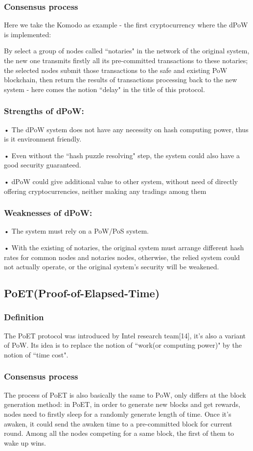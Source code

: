 \documentclass[]{article}
\begin{document}
\begin{CJK*}{UTF8}{gbsn}
    \subsubsection*{Consensus process}
    Here we take the Komodo as example - the first cryptocurrency where the dPoW is implemented:
	\par By select a group of nodes called ``notaries" in the network of the original system, the new one transmits firstly all its pre-committed transactions to these notaries;	the selected nodes submit those transactions to the safe and existing PoW blockchain, then return the results of transactions processing back to the new system - here comes the notion ``delay" in the title of this protocol.
	\subsubsection*{Strengths of dPoW:}		
    • The dPoW system does not have any necessity on hash computing power, thus is it environment friendly.
    \par • Even without the ``hash puzzle resolving" step, the system could also have a good security guaranteed.
    \par • dPoW could give additional value to other system, without need of directly offering cryptocurrencies, neither making any tradings among them
	\subsubsection*{Weaknesses of dPoW:}	
    • The system must rely on a PoW/PoS system.
    \par • With the existing of notaries, the original system must arrange different hash rates for common nodes and notaries nodes, otherwise, the relied system could not actually operate, or the original system’s security will be weakened.
    
    \subsection{ PoET(Proof-of-Elapsed-Time)} 
\subsubsection*{Definition} 
The PoET protocol was introduced by Intel research team[14], it’s also a variant of PoW. Its idea is to replace the notion of ``work(or computing power)" by the notion of ``time cost".
	\subsubsection*{Consensus process}
	The process of PoET is also basically the same to PoW, only differs at the block generation method: in PoET, in order to generate new blocks and get rewards, nodes need to firstly sleep for a randomly generate length of time. Once it’s awaken, it could send the awaken time to a pre-committed block for current round. Among all the nodes competing for a same block, the first of them to wake up wins.

\end{CJK*}
\end{document}

